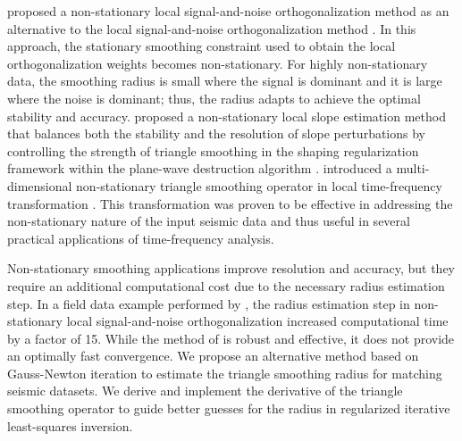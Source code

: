 \cite{chenfomelorthon2021} proposed a non-stationary local signal-and-noise orthogonalization method as an alternative to the local signal-and-noise orthogonalization method \cite[]{chenfomel2015}. In this approach, the stationary smoothing constraint used to obtain the local orthogonalization weights becomes non-stationary. For highly non-stationary data, the smoothing radius is small where the signal is dominant and it is large where the noise is dominant; thus, the radius adapts to achieve the optimal stability and accuracy. 
\cite{wang2021} proposed a non-stationary local slope estimation method that balances both the stability and the resolution of slope perturbations by controlling the strength of triangle smoothing in the shaping regularization framework within the plane-wave destruction algorithm \cite[]{fomel2002}.
\cite{chen2021} introduced a multi-dimensional non-stationary triangle smoothing operator in local time-frequency transformation \cite[]{liufomel2013}. This transformation was proven to be effective in addressing the non-stationary nature of the input seismic data and thus useful in several practical applications of time-frequency analysis. 

Non-stationary smoothing applications improve resolution and accuracy, but they require an additional computational cost due to the necessary radius estimation step.
In a field data example performed by \cite{chenfomelorthon2021}, the radius estimation step in non-stationary local signal-and-noise orthogonalization increased computational time by a factor of 15. 
While the method of \cite{greerfomel2018} is robust and effective, it does not provide an optimally fast convergence. We propose an alternative method based on Gauss-Newton iteration to estimate the triangle smoothing radius for matching seismic datasets. We derive and implement the derivative of the triangle smoothing operator to guide better guesses for the radius in regularized iterative least-squares inversion. 

